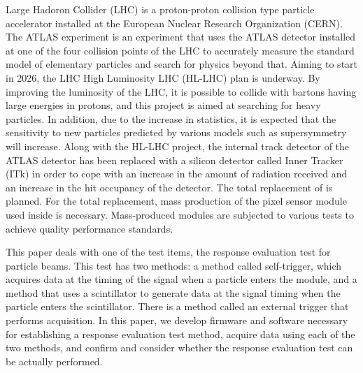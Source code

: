 Large Hadoron Collider (LHC) is a proton-proton collision type particle accelerator installed at the European Nuclear Research Organization (CERN). The ATLAS experiment is an experiment that uses the ATLAS detector installed at one of the four collision points of the LHC to accurately measure the standard model of elementary particles and search for physics beyond that. Aiming to start in 2026, the LHC High Luminosity LHC (HL-LHC) plan is underway. By improving the luminosity of the LHC, it is possible to collide with bartons having large energies in protons, and this project is aimed at searching for heavy particles. In addition, due to the increase in statistics, it is expected that the sensitivity to new particles predicted by various models such as supersymmetry will increase. Along with the HL-LHC project, the internal track detector of the ATLAS detector has been replaced with a silicon detector called Inner Tracker (ITk) in order to cope with an increase in the amount of radiation received and an increase in the hit occupancy of the detector. The total replacement of is planned. For the total replacement, mass production of the pixel sensor module used inside is necessary. Mass-produced modules are subjected to various tests to achieve quality performance standards.\par
This paper deals with one of the test items, the response evaluation test for particle beams. This test has two methods: a method called self-trigger, which acquires data at the timing of the signal when a particle enters the module, and a method that uses a scintillator to generate data at the signal timing when the particle enters the scintillator. There is a method called an external trigger that performs acquisition. In this paper, we develop firmware and software necessary for establishing a response evaluation test method, acquire data using each of the two methods, and confirm and consider whether the response evaluation test can be actually performed. 
